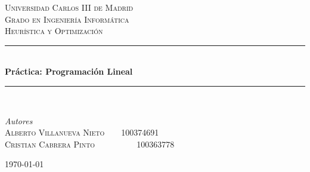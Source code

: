 \documentclass[11pt,spanish]{article}
\begin{document}



	\begin{titlepage} %
	
	\newcommand{\HRule}{\rule{\linewidth}{0.5mm}} %
	
	\center %
	
	
	\textsc{\LARGE Universidad Carlos III de Madrid}\\[1.5cm] %
	
	\textsc{\Large Grado en Ingeniería Informática}\\[0.5cm] %
	
	\textsc{\large Heurística y Optimización}\\[0.5cm] %
	
	
	\HRule\\[0.4cm]
	
	{\huge\bfseries Práctica: Programación Lineal}\\[0.4cm] %
	
	\HRule\\[1.5cm]
	
	
	\begin{minipage}{0.7\textwidth}
		\begin{flushleft}
			\large
			\textit{Autores}\\
			\textsc{Alberto Villanueva Nieto\ \ \ \ 100374691}\\
			\textsc{Cristian Cabrera Pinto\ \ \ \ \ \ \ \ \ \ 100363778}
		\end{flushleft}
	\end{minipage}

	
	\vfill\vfill\vfill %
	
	{\large\today} %
	
	\vfill %
	
	\end{titlepage}
	\newpage
	\tableofcontents
	\newpage
\end{document}
